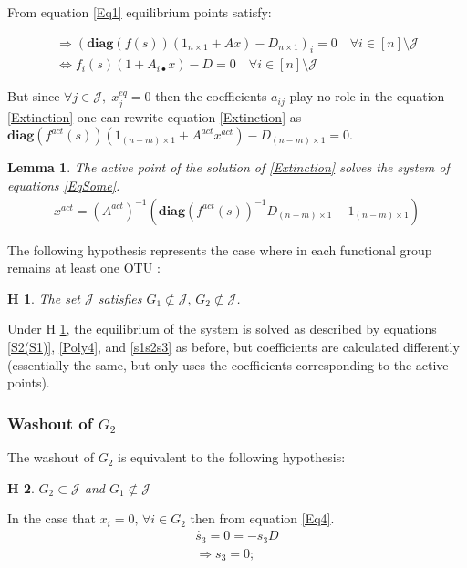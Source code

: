 \documentclass[3p,times]{elsarticle}
\newcommand{\diag}{\textbf{diag}}
\newtheorem{hypo}{H}
\newtheorem{lemma}{Lemma}
\begin{document}
From equation \eqref{Eq1} equilibrium points satisfy: 

\begin{align}
\Rightarrow  (\diag (f(s))(1_{n\times 1}+ Ax) - D_{n\times 1})_i = 0 \quad \forall i \in [n]\setminus \mathcal{J} \\
\Leftrightarrow f_i(s)(1 + A_{i\bullet}x) - D = 0 \quad \forall i \in [n]\setminus \mathcal{J} \label{Extinction}
\end{align} 

But since $\forall j \in \mathcal{J}, \; x^{eq}_j = 0 $ then the coefficients $a_{ij}$ play no role in the equation \eqref{Extinction} one can rewrite equation \eqref{Extinction} as $\diag(f^{act}(s))(1_{(n-m)\times 1} + A^{act}x^{act}) - D_{(n-m) \times 1}=0 $.

\begin{lemma} 
	The active point of the solution of \eqref{Extinction} solves the system of equations \eqref{EqSome}. 
	\begin{align}
	\label{EqSome}x^{act} = (A^{act})^{-1}(\diag(f^{act}(s))^{-1}D_{(n-m)\times 1} - 1_{(n-m)\times 1})
	\end{align} 
\end{lemma} 

The following hypothesis represents the case where in each functional group remains at least one OTU :
\begin{hypo}The set $\mathcal{J}$ satisfies $ G_1 \not \subset \mathcal{J} , \, G_2 \not \subset \mathcal{J} $.
	\label{noWashoutHyp}
\end{hypo} 

Under H \ref{noWashoutHyp}, the equilibrium of the system is solved as described by equations \eqref{S2(S1)}, \eqref{Poly4}, and \eqref{s1s2s3} as before, but coefficients are calculated differently (essentially the same, but only uses the coefficients corresponding to the active points).

\subsubsection{Washout of $G_2$}

The washout of $G_2$ is equivalent to the following hypothesis:

\begin{hypo}
	$G_2 \subset \mathcal{J}$ and $G_1 \not \subset \mathcal{J}$
	\label{WashoutG2}
\end{hypo} 

In the case that $x_i = 0, \, \forall i \in G_2$ then from equation \eqref{Eq4}.
\begin{align}
\dot{s_3} = 0 = -s_3D \\
\Rightarrow s_3 = 0;
\end{align}
\end{document}
